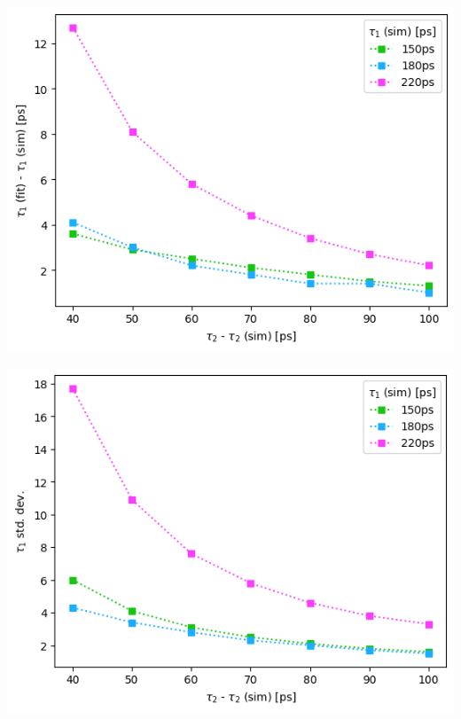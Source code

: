 {\begin{minipage}{.47\linewidth}
    \includegraphics[width=\linewidth]{Batch 3/regular IRF/t1-diff 5050.png}
    \label{fig:comp-t1-5050}
\end{minipage}
\hfill
\begin{minipage}{.47\linewidth}
    \includegraphics[width=\linewidth]{Batch 3/regular IRF/t1-err 5050.png}
    \label{fig:comp-t1err-5050}
\end{minipage}
\begin{minipage}{.47\linewidth}

\end{minipage}}
